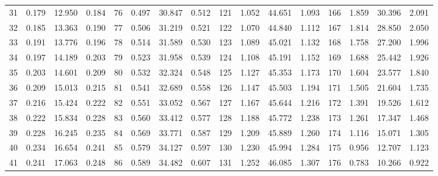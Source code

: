 \begin{table}
{\begin{tabular}{rrrr|rrrr|rrrr|rrrr}
 31 & \tiny{  0.179} &  12.950 & \tiny{  0.184} &  76 & \tiny{  0.497} &  30.847 & \tiny{  0.512} & 121 & \tiny{  1.052} &  44.651 & \tiny{  1.093} & 166 & \tiny{  1.859} &  30.396 & \tiny{  2.091}\\
 32 & \tiny{  0.185} &  13.363 & \tiny{  0.190} &  77 & \tiny{  0.506} &  31.219 & \tiny{  0.521} & 122 & \tiny{  1.070} &  44.840 & \tiny{  1.112} & 167 & \tiny{  1.814} &  28.850 & \tiny{  2.050}\\
 33 & \tiny{  0.191} &  13.776 & \tiny{  0.196} &  78 & \tiny{  0.514} &  31.589 & \tiny{  0.530} & 123 & \tiny{  1.089} &  45.021 & \tiny{  1.132} & 168 & \tiny{  1.758} &  27.200 & \tiny{  1.996}\\
 34 & \tiny{  0.197} &  14.189 & \tiny{  0.203} &  79 & \tiny{  0.523} &  31.958 & \tiny{  0.539} & 124 & \tiny{  1.108} &  45.191 & \tiny{  1.152} & 169 & \tiny{  1.688} &  25.442 & \tiny{  1.926}\\
 35 & \tiny{  0.203} &  14.601 & \tiny{  0.209} &  80 & \tiny{  0.532} &  32.324 & \tiny{  0.548} & 125 & \tiny{  1.127} &  45.353 & \tiny{  1.173} & 170 & \tiny{  1.604} &  23.577 & \tiny{  1.840}\\
 36 & \tiny{  0.209} &  15.013 & \tiny{  0.215} &  81 & \tiny{  0.541} &  32.689 & \tiny{  0.558} & 126 & \tiny{  1.147} &  45.503 & \tiny{  1.194} & 171 & \tiny{  1.505} &  21.604 & \tiny{  1.735}\\
 37 & \tiny{  0.216} &  15.424 & \tiny{  0.222} &  82 & \tiny{  0.551} &  33.052 & \tiny{  0.567} & 127 & \tiny{  1.167} &  45.644 & \tiny{  1.216} & 172 & \tiny{  1.391} &  19.526 & \tiny{  1.612}\\
 38 & \tiny{  0.222} &  15.834 & \tiny{  0.228} &  83 & \tiny{  0.560} &  33.412 & \tiny{  0.577} & 128 & \tiny{  1.188} &  45.772 & \tiny{  1.238} & 173 & \tiny{  1.261} &  17.347 & \tiny{  1.468}\\
 39 & \tiny{  0.228} &  16.245 & \tiny{  0.235} &  84 & \tiny{  0.569} &  33.771 & \tiny{  0.587} & 129 & \tiny{  1.209} &  45.889 & \tiny{  1.260} & 174 & \tiny{  1.116} &  15.071 & \tiny{  1.305}\\
 40 & \tiny{  0.234} &  16.654 & \tiny{  0.241} &  85 & \tiny{  0.579} &  34.127 & \tiny{  0.597} & 130 & \tiny{  1.230} &  45.994 & \tiny{  1.284} & 175 & \tiny{  0.956} &  12.707 & \tiny{  1.123}\\
 41 & \tiny{  0.241} &  17.063 & \tiny{  0.248} &  86 & \tiny{  0.589} &  34.482 & \tiny{  0.607} & 131 & \tiny{  1.252} &  46.085 & \tiny{  1.307} & 176 & \tiny{  0.783} &  10.266 & \tiny{  0.922}\\

\end{tabular}}
\end{table}
